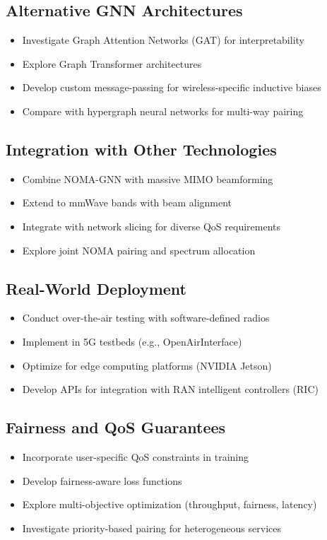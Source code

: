 \subsection{Alternative GNN Architectures}
\begin{itemize}
    \item Investigate Graph Attention Networks (GAT) for interpretability
    \item Explore Graph Transformer architectures
    \item Develop custom message-passing for wireless-specific inductive biases
    \item Compare with hypergraph neural networks for multi-way pairing
\end{itemize}

\subsection{Integration with Other Technologies}
\begin{itemize}
    \item Combine NOMA-GNN with massive MIMO beamforming
    \item Extend to mmWave bands with beam alignment
    \item Integrate with network slicing for diverse QoS requirements
    \item Explore joint NOMA pairing and spectrum allocation
\end{itemize}

\subsection{Real-World Deployment}
\begin{itemize}
    \item Conduct over-the-air testing with software-defined radios
    \item Implement in 5G testbeds (e.g., OpenAirInterface)
    \item Optimize for edge computing platforms (NVIDIA Jetson)
    \item Develop APIs for integration with RAN intelligent controllers (RIC)
\end{itemize}

\subsection{Fairness and QoS Guarantees}
\begin{itemize}
    \item Incorporate user-specific QoS constraints in training
    \item Develop fairness-aware loss functions
    \item Explore multi-objective optimization (throughput, fairness, latency)
    \item Investigate priority-based pairing for heterogeneous services
\end{itemize}

